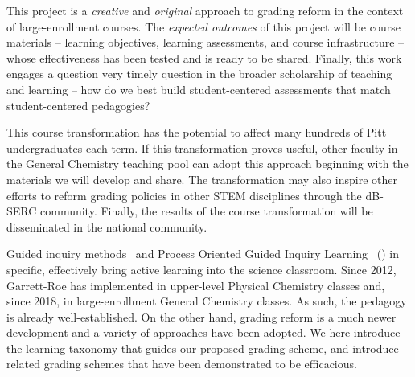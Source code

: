 \documentclass[10pt,letterpaper]{article}
\begin{document}
This project is a \textit{creative} and \textit{original} approach to grading reform in the context of large-enrollment courses.
%
The \textit{expected outcomes} of this project will be course materials -- learning objectives, learning assessments, and course infrastructure -- whose effectiveness has been tested and is ready to be shared. 
%
%
Finally, this work engages a question very timely question in the broader scholarship of teaching and learning -- how do we best build student-centered assessments that match student-centered pedagogies? 

This course transformation has the potential to affect many hundreds of Pitt undergraduates each term. If this transformation proves useful, other faculty in the General Chemistry teaching pool can adopt this approach beginning with the materials we will develop and share.  The transformation may also inspire other efforts to reform grading policies in other STEM disciplines through the dB-SERC community. Finally, the results of the course transformation will be disseminated in the national \pogil community.

Guided inquiry methods~\cite{farrellJCE-99,lewisJCE-05,minderhoutBMBE-07,moog-08,eberleinBMBE-08} and Process Oriented Guided Inquiry Learning~\cite{moog-08} (\pogil) in specific, effectively bring active learning into the science classroom. Since 2012, Garrett-Roe has implemented \pogil in upper-level Physical Chemistry classes and, since 2018, in large-enrollment General Chemistry classes.\cite{Vincent-Ruz2020} As such, the \pogil pedagogy is already well-established. On the other hand, grading reform is a much newer development and a variety of approaches have been adopted. We here introduce the learning taxonomy that guides our proposed grading scheme, and introduce related grading schemes that have been demonstrated to be efficacious.
\end{document}
